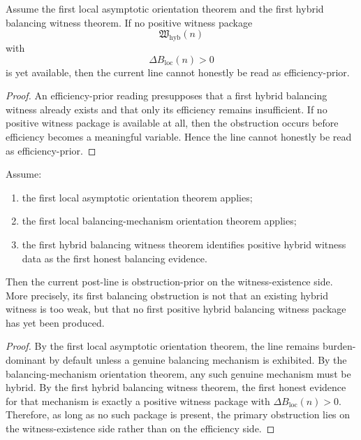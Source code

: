 \begin{proposition}
\label{prop:asymptotic-burden-dominance-blocks-efficiency-first-readings}
Assume the first local asymptotic orientation theorem and the first hybrid balancing witness theorem.
If no positive witness package
\[
 \mathfrak W_{\mathrm{hyb}}(n)
\]
with
\[
 \Delta B_{\mathrm{loc}}(n)>0
\]
is yet available, then the current line cannot honestly be read as efficiency-prior.
\end{proposition}

\begin{proof}
An efficiency-prior reading presupposes that a first hybrid balancing witness already exists and that only its efficiency remains insufficient. If no positive witness package is available at all, then the obstruction occurs before efficiency becomes a meaningful variable. Hence the line cannot honestly be read as efficiency-prior.
\end{proof}

\begin{theorem}
\label{thm:first-hybrid-obstruction-orientation-theorem}
Assume:
\begin{enumerate}[leftmargin=2em,label=(\alph*)]
 \item the first local asymptotic orientation theorem applies;
 \item the first local balancing-mechanism orientation theorem applies;
 \item the first hybrid balancing witness theorem identifies positive hybrid witness data as the first honest balancing evidence.
\end{enumerate}
Then the current post-line is obstruction-prior on the witness-existence side.
More precisely, its first balancing obstruction is not that an existing hybrid witness is too weak, but that no first positive hybrid balancing witness package has yet been produced.
\end{theorem}

\begin{proof}
By the first local asymptotic orientation theorem, the line remains burden-dominant by default unless a genuine balancing mechanism is exhibited. By the balancing-mechanism orientation theorem, any such genuine mechanism must be hybrid. By the first hybrid balancing witness theorem, the first honest evidence for that mechanism is exactly a positive witness package with \(\Delta B_{\mathrm{loc}}(n)>0\). Therefore, as long as no such package is present, the primary obstruction lies on the witness-existence side rather than on the efficiency side.
\end{proof}

